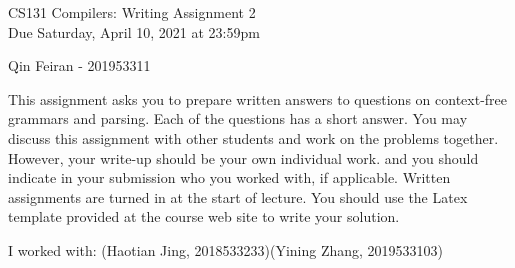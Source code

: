 \documentclass[10pt]{article}
\begin{document}
\begin{center}
\Large CS131 Compilers: Writing Assignment 2\\Due Saturday, April 10, 2021 at 23:59pm
\end{center}

\begin{center}
\LARGE Qin Feiran - 201953311
\end{center}

This assignment asks you to prepare written answers to questions on
context-free grammars and parsing. Each of the questions has a short answer. You
may discuss this assignment with other students and work on the problems
together. However, your write-up should be your own individual work.
and you should indicate in your submission who you worked with, if applicable.
Written assignments are turned in at the start of lecture.
You should use the Latex template provided at the course web site to write your solution.

\begin{center}
I worked with: (Haotian Jing, 2018533233)(Yining Zhang, 2019533103)
\end{center}
\end{document}
